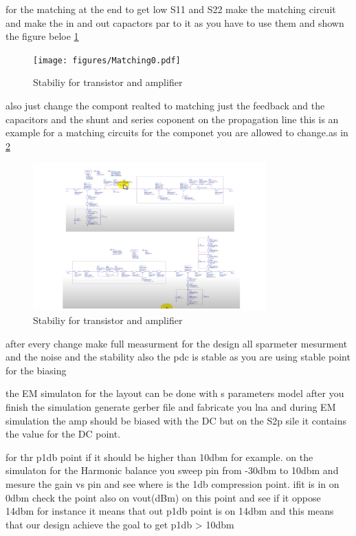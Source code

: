 \documentclass{article}
\begin{document}
\begin{itemize}
    for the matching at the end to get low S11 and S22  make the matching circuit and make the in and out capactors par to it as you have to use them and shown the figure  beloe \cref{Matching0}

    \begin{figure}[H]
        \centering
        \texttt{[image: figures/Matching0.pdf]}
        \caption{Stabiliy for transistor and amplifier}
        \label{Matching0}
    \end{figure}

    also just change the compont realted to matching just the feedback and the capacitors and the shunt and series coponent on the propagation line this is an example for a matching  circuits for the componet you are allowed to change.as in \cref{Matching1}
    \begin{figure}[H]
        \centering
        \includegraphics[width=0.8\textwidth]{figures/Matching1.pdf}
        \caption{Stabiliy for transistor and amplifier}
        \label{Matching1}
    \end{figure}

    after every change make full measurment for the design all sparmeter  mesurment and the noise and the stability also the pdc is stable as you are using stable point for the biasing 


the EM simulaton for the layout can be done with s parameters model after you finish the simulation generate  gerber file and fabricate you lna and during EM simulation the amp should be biased with the DC but on the S2p sile it contains the value for the DC point.

for thr p1db point if it should be  higher than 10dbm for example. on the simulaton for the Harmonic balance you sweep pin from -30dbm to 10dbm and mesure the gain vs pin and see where is the 1db compression point. ifit is in on 0dbm check the point also on vout(dBm) on this point and see if it oppose 14dbm for instance it means that out p1db point is on 14dbm  and this means that our design achieve the goal to get p1db > 10dbm 



\end{itemize}
\end{document}

